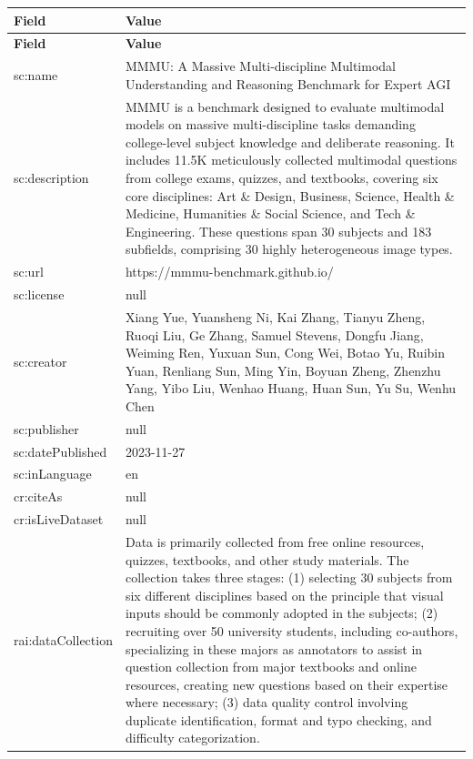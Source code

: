 \documentclass[10pt,a4paper]{article}
\begin{document}
\begin{longtable}{|p{4cm}|p{12cm}|}
\hline
\textbf{Field} & \textbf{Value} \\
\hline
\endfirsthead
\hline
\textbf{Field} & \textbf{Value} \\
\hline
\endhead
\hline
\endfoot

sc:name & MMMU: A Massive Multi-discipline Multimodal Understanding and Reasoning Benchmark for Expert AGI \\
\hline
sc:description & MMMU is a benchmark designed to evaluate multimodal models on massive multi-discipline tasks demanding college-level subject knowledge and deliberate reasoning. It includes 11.5K meticulously collected multimodal questions from college exams, quizzes, and textbooks, covering six core disciplines: Art \& Design, Business, Science, Health \& Medicine, Humanities \& Social Science, and Tech \& Engineering. These questions span 30 subjects and 183 subfields, comprising 30 highly heterogeneous image types. \\
\hline
sc:url & https://mmmu-benchmark.github.io/ \\
\hline
sc:license & null \\
\hline
sc:creator & Xiang Yue, Yuansheng Ni, Kai Zhang, Tianyu Zheng, Ruoqi Liu, Ge Zhang, Samuel Stevens, Dongfu Jiang, Weiming Ren, Yuxuan Sun, Cong Wei, Botao Yu, Ruibin Yuan, Renliang Sun, Ming Yin, Boyuan Zheng, Zhenzhu Yang, Yibo Liu, Wenhao Huang, Huan Sun, Yu Su, Wenhu Chen \\
\hline
sc:publisher & null \\
\hline
sc:datePublished & 2023-11-27 \\
\hline
sc:inLanguage & en \\
\hline
cr:citeAs & null \\
\hline
cr:isLiveDataset & null \\
\hline
rai:dataCollection & Data is primarily collected from free online resources, quizzes, textbooks, and other study materials. The collection takes three stages: (1) selecting 30 subjects from six different disciplines based on the principle that visual inputs should be commonly adopted in the subjects; (2) recruiting over 50 university students, including co-authors, specializing in these majors as annotators to assist in question collection from major textbooks and online resources, creating new questions based on their expertise where necessary; (3) data quality control involving duplicate identification, format and typo checking, and difficulty categorization. \\

\end{longtable}
\end{document}
